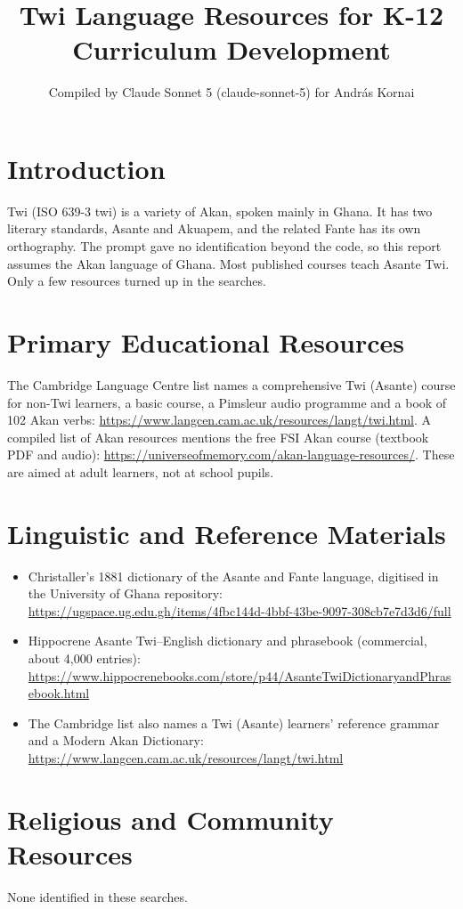 \documentclass[12pt]{article}
\title{Twi Language Resources for K-12 Curriculum Development}
\author{Compiled by Claude Sonnet 5 (claude-sonnet-5) for Andr\'as Kornai}
\date{}
\begin{document}
\maketitle

\section{Introduction}
Twi (ISO 639-3 twi) is a variety of Akan, spoken mainly in Ghana. It has two literary standards, Asante and Akuapem, and the related Fante has its own orthography. The prompt gave no identification beyond the code, so this report assumes the Akan language of Ghana. Most published courses teach Asante Twi. Only a few resources turned up in the searches.

\section{Primary Educational Resources}
The Cambridge Language Centre list names a comprehensive Twi (Asante) course for non-Twi learners, a basic course, a Pimsleur audio programme and a book of 102 Akan verbs: \url{https://www.langcen.cam.ac.uk/resources/langt/twi.html}. A compiled list of Akan resources mentions the free FSI Akan course (textbook PDF and audio): \url{https://universeofmemory.com/akan-language-resources/}. These are aimed at adult learners, not at school pupils.

\section{Linguistic and Reference Materials}
\begin{itemize}
\item Christaller's 1881 dictionary of the Asante and Fante language, digitised in the University of Ghana repository: \url{https://ugspace.ug.edu.gh/items/4fbc144d-4bbf-43be-9097-308cb7e7d3d6/full}
\item Hippocrene Asante Twi--English dictionary and phrasebook (commercial, about 4,000 entries): \url{https://www.hippocrenebooks.com/store/p44/AsanteTwiDictionaryandPhrasebook.html}
\item The Cambridge list also names a Twi (Asante) learners' reference grammar and a Modern Akan Dictionary: \url{https://www.langcen.cam.ac.uk/resources/langt/twi.html}
\end{itemize}

\section{Religious and Community Resources}
None identified in these searches.
\end{document}
